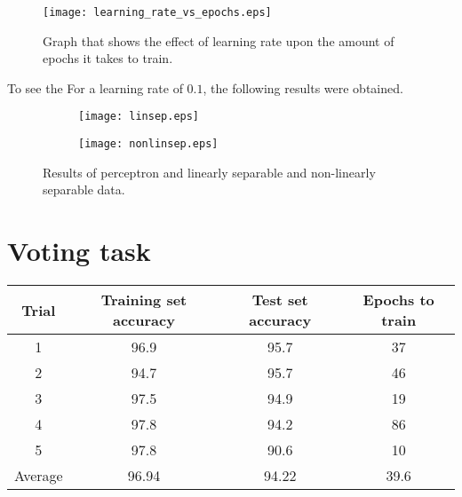 \documentclass[12pt,letterpaper]{article}
\begin{document}
\begin{figure}[H]
\begin{center}
	\texttt{[image: learning\_rate\_vs\_epochs.eps]} 
\end{center}
\caption{Graph that shows the effect of learning rate upon the amount of epochs it takes to train.}
\end{figure}

To see the For a learning rate of $0.1$, the following results were obtained.

\begin{center}
\begin{figure}[H]
	\begin{subfigure}[h]{0.5\textwidth}
		\texttt{[image: linsep.eps]} 
	\end{subfigure}
	\begin{subfigure}[h]{0.5\textwidth}
		\texttt{[image: nonlinsep.eps]} 
	\end{subfigure}
\caption{Results of perceptron and linearly separable and non-linearly separable data.}
\end{figure}
\end{center}

\section*{Voting task}

\begin{tabular}{cccc}
\toprule
Trial	&	Training set accuracy	&	Test set accuracy 	&	Epochs to train\\
\hline
1	&	96.9	&	95.7	&	37\\
2	&	94.7	&	95.7	&	46\\
3	&	97.5	&	94.9	&	19\\
4	&	97.8	&	94.2	&	86\\
5	&	97.8	&	90.6	&	10\\
\hline
Average	&	96.94	&	94.22	&	39.6\\
\bottomrule
\end{tabular}
\end{document}
